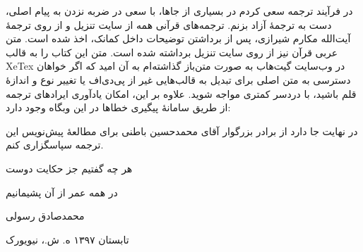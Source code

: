 {	در فرآیند ترجمه سعی کردم در بسیاری از جاها، با سعی در ضربه نزدن به پیام اصلی، دست به ترجمهٔ آزاد بزنم. ترجمه‌های قرآنی همه از سایت تنزیل و از روی ترجمهٔ آیت‌الله مکارم شیرازی، پس از برداشتن توضیحات داخل کمانک، اخذ شده است. متن عربی قرآن نیز از روی سایت تنزیل برداشته شده است. متن این کتاب را به قالب XeTex در وب‌سایت گیت‌هاب‌‌ به صورت متن‌باز گذاشته‌ام به آن امید که اگر خواهان دسترسی به متن اصلی برای تبدیل به قالب‌هایی غیر از پی‌دی‌اف یا تغییر نوع و اندازهٔ قلم باشید، با دردسر کمتری مواجه شوید. علاوه بر این، امکان یادآوری ایرادهای ترجمه از طریق سامانهٔ پیگیری خطاها در این وبگاه وجود دارد:
	\begin{center}
	\end{center}
	در نهایت جا دارد از برادر بزرگوار آقای محمدحسین باطنی برای مطالعهٔ پیش‌نویس این ترجمه سپاسگزاری کنم. 
	
	\begin{center}
		هر چه گفتیم جز حکایت دوست
		
		در همه عمر از آن پشیمانیم
	\end{center}
	\begin{flushleft}
		{
			محمدصادق رسولی
			
			تابستان ۱۳۹۷ ه. ش.،	نیویورک
		}
	\end{flushleft}
	
}











